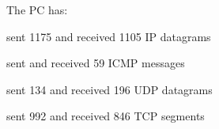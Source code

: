 The PC has:
\begin{tabular}
	\item sent 1175 and received 1105 IP datagrams
	\item sent and received 59 ICMP messages
	\item sent 134 and received 196 UDP datagrams
	\item sent 992 and received 846 TCP segments
\end{tabular}